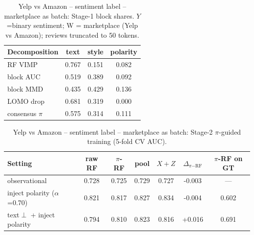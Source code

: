 \documentclass[11pt]{article}
\begin{document}
\begin{table}[t]
\centering
\small
\caption{Yelp vs Amazon  --  sentiment label  --  marketplace as batch: Stage-1 block shares. $Y$=binary sentiment; W = marketplace (Yelp vs Amazon); reviews truncated to 50 tokens.}
\begin{tabular}{lccc}
\toprule
Decomposition & text & style & polarity \\
\midrule
RF VIMP & 0.767 & 0.151 & 0.082 \\
block AUC & 0.519 & 0.389 & 0.092 \\
block MMD & 0.435 & 0.429 & 0.136 \\
LOMO drop & 0.681 & 0.319 & 0.000 \\
consensus $\pi$ & 0.575 & 0.314 & 0.111 \\
\bottomrule
\end{tabular}
\end{table}

\begin{table}[t]
\centering
\small
\caption{Yelp vs Amazon  --  sentiment label  --  marketplace as batch: Stage-2 $\pi$-guided training (5-fold CV AUC).}
\begin{tabular}{lcccccc}
\toprule
Setting & raw RF & $\pi$-RF & pool & $X{+}Z$ & $\Delta_{\pi\mathrm{-RF}}$ & $\pi$-RF on GT \\
\midrule
observational & 0.728 & 0.725 & 0.729 & 0.727 & -0.003 & --- \\
inject polarity ($\alpha$=0.70) & 0.821 & 0.817 & 0.827 & 0.834 & -0.004 & 0.602 \\
text$\perp$ + inject polarity & 0.794 & 0.810 & 0.823 & 0.816 & +0.016 & 0.691 \\
\bottomrule
\end{tabular}
\end{table}
\end{document}
